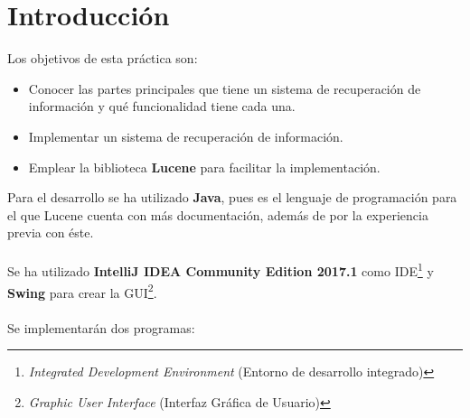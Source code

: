 	
	
	
\setcounter{page}{0}

\maketitle %
\thispagestyle{empty}

\newpage %

\tableofcontents %

\newpage %

\listoffigures


\newpage


\section{Introducción}
\label{sec:intro}

Los objetivos de esta práctica son:

\begin{itemize}
	\item Conocer las partes principales que tiene un sistema de recuperación de información y qué funcionalidad tiene cada una.
	\item Implementar un sistema de recuperación de información.
	\item Emplear la biblioteca \textbf{Lucene} para facilitar la implementación.
\end{itemize}

Para el desarrollo se ha utilizado \textbf{Java}, pues es el lenguaje de programación para el que Lucene cuenta con más documentación, además de por la experiencia previa con éste.
\\ \\
Se ha utilizado \textbf{IntelliJ IDEA Community Edition 2017.1} como IDE\footnote{\textit{Integrated Development Environment} (Entorno de desarrollo integrado)} y \textbf{Swing} para crear la GUI\footnote{\textit{Graphic User Interface} (Interfaz Gráfica de Usuario)}.
\\ \\
Se implementarán dos programas:


